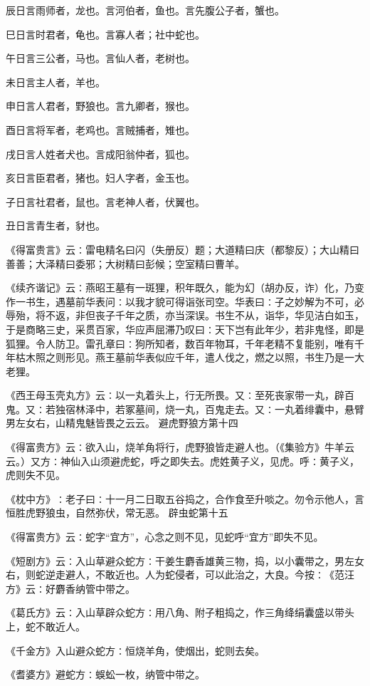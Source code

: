 \documentclass[a4paper,12pt,UTF8,twoside]{ctexbook}
\begin{document}
辰日言雨师者，龙也。言河伯者，鱼也。言先腹公子者，蟹也。

巳日言时君者，龟也。言寡人者；社中蛇也。

午日言三公者，马也。言仙人者，老树也。

未日言主人者，羊也。

申日言人君者，野狼也。言九卿者，猴也。

酉日言将军者，老鸡也。言贼捕者，雉也。

戌日言人姓者犬也。言成阳翁仲者，狐也。

亥日言臣君者，猪也。妇人字者，金玉也。

子日言社君者，鼠也。言老神人者，伏翼也。

丑日言青生者，豺也。

《得富贵言》云∶雷电精名曰闪（失册反）题；大道精曰庆（都黎反）；大山精曰善善；大泽精曰委邪；大树精曰彭候；空室精曰曹羊。

《续齐谐记》云∶燕昭王墓有一斑狸，积年既久，能为幻（胡办反，诈）化，乃变作一书生，遇墓前华表问∶以我才貌可得诣张司空。华表曰∶子之妙解为不可，必辱殆，将不返，非但丧子千年之质，亦当深误。书生不从，诣华，华见洁白如玉，于是商略三史，采贯百家，华应声屈滞乃叹曰∶天下岂有此年少，若非鬼怪，即是狐狸。令人防卫。雷孔章曰∶狗所知者，数百年物耳，千年老精不复能别，唯有千年枯木照之则形见。燕王墓前华表似应千年，遣人伐之，燃之以照，书生乃是一大老狸。

《西王母玉壳丸方》云∶以一丸着头上，行无所畏。又∶至死丧家带一丸，辟百鬼。又∶若独宿林泽中，若冢墓间，烧一丸，百鬼走去。又∶一丸着绯囊中，悬臂男左女右，山精鬼魅皆畏之云云。
避虎野狼方第十四

《得富贵方》云∶欲入山，烧羊角将行，虎野狼皆走避人也。（《集验方》牛羊云云。）又方∶神仙入山须避虎蛇，呼之即失去。虎姓黄子义，见虎。呼∶黄子义，虎则失不见。

《枕中方》∶老子曰∶十一月二日取五谷捣之，合作食至升啖之。勿令示他人，言恒胜虎野狼虫，自然弥伏，常无恶。
辟虫蛇第十五

《得富贵方》云∶蛇字“宜方”，心念之则不见，见蛇呼“宜方”即失不见。

《短剧方》云∶入山草避众蛇方∶干姜生麝香雄黄三物，捣，以小囊带之，男左女右，则蛇逆走避人，不敢近也。人为蛇侵者，可以此治之，大良。今按∶《范汪方》云∶好麝香纳管中带之。

《葛氏方》云∶入山草辟众蛇方∶用八角、附子粗捣之，作三角绛绢囊盛以带头上，蛇不敢近人。

《千金方》入山避众蛇方∶恒烧羊角，使烟出，蛇则去矣。

《耆婆方》避蛇方∶蜈蚣一枚，纳管中带之。
\end{document}
